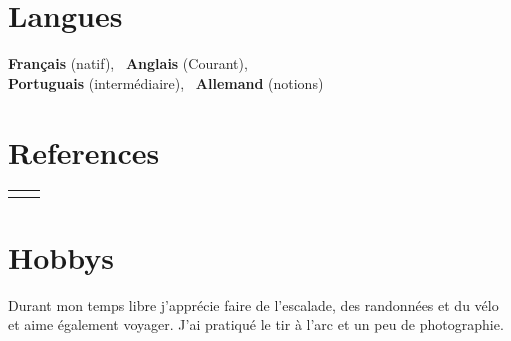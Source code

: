 \documentclass[10pt]{article} %
\begin{document}
\begin{paracol}{2}
\section{Langues}
\textbf{Fran\c cais} (natif), \, \textbf{Anglais} (Courant), \\
\textbf{Portuguais} (intermédiaire), \, \textbf{Allemand} (notions)
%
%
\section{References}
%
%
%
%
%
%
%
\begin{supertabular}{rl} %
%
%
%

\end{supertabular}
%
%
%
\section{Hobbys}
Durant mon temps libre j'apprécie faire de l'escalade, des randonnées et du
vélo et aime également voyager. J'ai pratiqué le tir à l'arc et un peu de
photographie.
%
\end{paracol}
%
%
\vspace{-1.5mm}
\huge\centering{}
%
\end{document}
